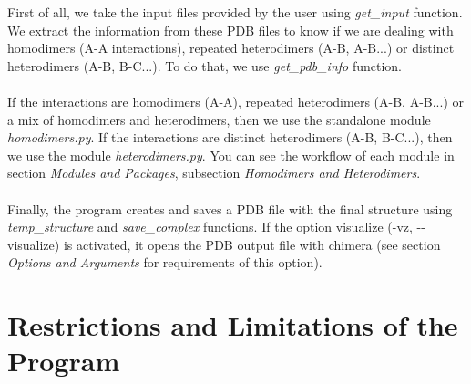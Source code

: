 \documentclass[a4paper,10pt]{report}
\begin{document}
First of all, we take the input files provided by the user using \textit{get\_input} function. We extract the information from these PDB files to know if we are dealing with homodimers (A-A interactions), repeated heterodimers (A-B, A-B...) or distinct heterodimers (A-B, B-C...). To do that, we use \textit{get\_pdb\_info} function.\\\\
If the interactions are homodimers (A-A), repeated heterodimers (A-B, A-B...) or a mix of homodimers and heterodimers, then we use the standalone module \textit{homodimers.py}. If the interactions are distinct heterodimers (A-B, B-C...), then we use the module \textit{heterodimers.py}. You can see the workflow of each module in section \textit{Modules and Packages}, subsection \textit{Homodimers and Heterodimers}.\\\\
Finally, the program creates and saves a PDB file with the final structure using \textit{temp\_structure} and \textit{save\_complex} functions. If the option visualize (-vz, -{}-visualize) is activated, it opens the PDB output file with chimera (see section \textit{Options and Arguments} for requirements of this option).


\section{Restrictions and Limitations of the Program}
\end{document}
